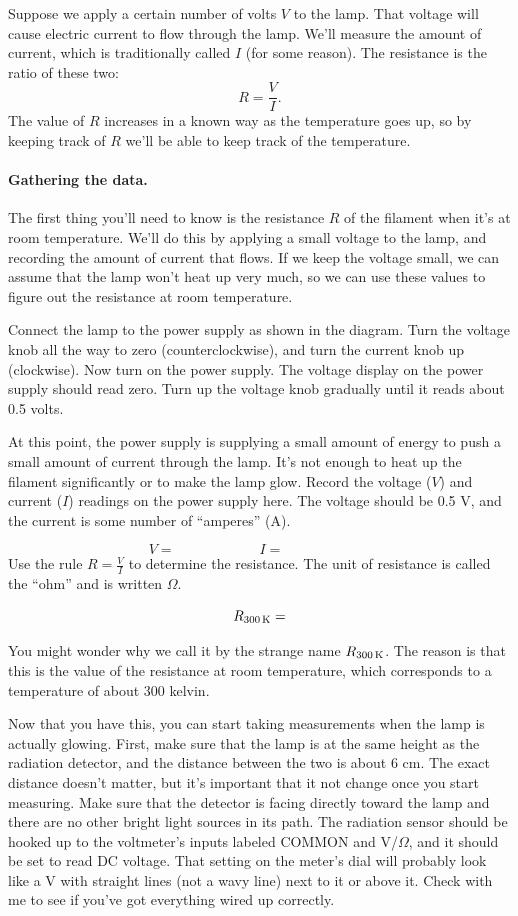 Suppose we apply a certain number of volts $V$ to the lamp. That voltage
will cause electric current to flow through the lamp. We'll measure
the amount of current, which is traditionally called $I$ (for some reason). 
The resistance is the ratio of these two:
$$
R = {\frac{V} I}.
$$
The value of $R$ increases in a known way as the temperature goes
up, so by keeping track of $R$ we'll be able to keep track of the
temperature.

\pagebreak[3]

\paragraph{Gathering the data.}
The first thing you'll need to know is the resistance $R$ of the filament
when it's at room temperature. We'll do this by applying a small voltage
to the lamp, and recording the amount of current that flows. If we keep
the voltage small, we can assume that the lamp won't heat up very much,
so we can use these values to figure out the resistance at 
room temperature.

Connect the lamp to the power supply as shown in the diagram.
Turn the voltage knob all the way to zero (counterclockwise), and turn
the current knob up (clockwise). Now turn on the power supply.
The voltage display on the power supply should read zero. Turn up the voltage
knob gradually until it reads about 0.5 volts.

At this point, the power supply is supplying a small amount of energy to push
a small amount of current through the lamp. It's not enough to heat up
the filament significantly or to make the lamp glow. 
Record the voltage ($V$) and current ($I$) readings on the power supply here. The voltage 
should be 0.5 V, and the current is some number of ``amperes'' (A).

\answerspace{0.5in}
$$
V=\qquad\qquad\qquad
I = \qquad\qquad\qquad\ 
$$
\answerspace{0.5in}
Use the rule $R={\frac{V} I}$ to determine the resistance. 
The unit of resistance is called the ``ohm'' and is written $\Omega$.

\answerspace{0.5in}
$$
R_{300\,{\rm K}}=
$$
\answerspace{0.5in}

You might wonder why we call it by the strange name $R_{300\,{\rm K}}$.
The reason is that this is the value of the resistance at room temperature, 
which corresponds to a 
temperature of about 300 kelvin. 

Now that you have this, you can start taking measurements when the lamp
is actually glowing. First, make sure that the lamp is at the same height
as the radiation detector, and the distance between the two is about 6 cm.
The exact distance doesn't matter, but it's important that it not 
change once you start measuring. Make sure that the detector is facing
directly toward the lamp and there are no other bright light sources
in its path. The radiation sensor should be hooked up to the
voltmeter's inputs labeled COMMON and V/$\Omega$, and it should 
be set to read DC voltage. That setting on the meter's dial will
probably look like a V with straight lines (not a wavy line) 
next to it or above it.
Check with me to see if you've got everything wired up correctly.

